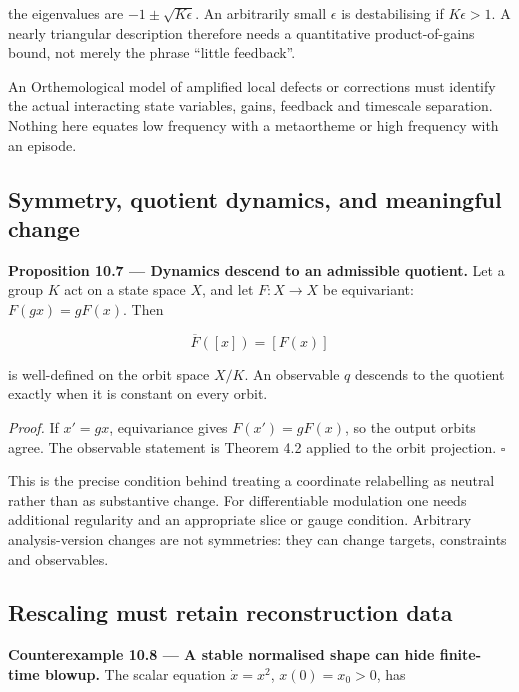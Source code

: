 \documentclass[11pt,a4paper]{article}
\begin{document}
the eigenvalues are \(-1\pm\sqrt{K\epsilon}\). An arbitrarily small
\(\epsilon\) is destabilising if \(K\epsilon>1\). A nearly triangular
description therefore needs a quantitative product-of-gains bound, not
merely the phrase ``little feedback''.

An Orthemological model of amplified local defects or corrections must
identify the actual interacting state variables, gains, feedback and
timescale separation. Nothing here equates low frequency with a
metaortheme or high frequency with an episode.

\subsection{Symmetry, quotient dynamics, and meaningful
change}\label{symmetry-quotient-dynamics-and-meaningful-change}


\textbf{Proposition 10.7 --- Dynamics descend to an admissible
quotient.} Let a group \(K\) act on a state space \(X\), and let
\(F:X\to X\) be equivariant: \(F(gx)=gF(x)\). Then

\nopagebreak[4]

\[\overline F([x])=[F(x)]\]

is well-defined on the orbit space \(X/K\). An observable \(q\) descends
to the quotient exactly when it is constant on every orbit.

\emph{Proof.} If \(x'=gx\), equivariance gives \(F(x')=gF(x)\), so the
output orbits agree. The observable statement is Theorem 4.2 applied to
the orbit projection. \(\square\)

This is the precise condition behind treating a coordinate relabelling
as neutral rather than as substantive change. For differentiable
modulation one needs additional regularity and an appropriate slice or
gauge condition. Arbitrary analysis-version changes are not symmetries:
they can change targets, constraints and observables.

\subsection{Rescaling must retain reconstruction
data}\label{rescaling-must-retain-reconstruction-data}


\textbf{Counterexample 10.8 --- A stable normalised shape can hide
finite-time blowup.} The scalar equation \(\dot x=x^2\), \(x(0)=x_0>0\),
has
\end{document}

